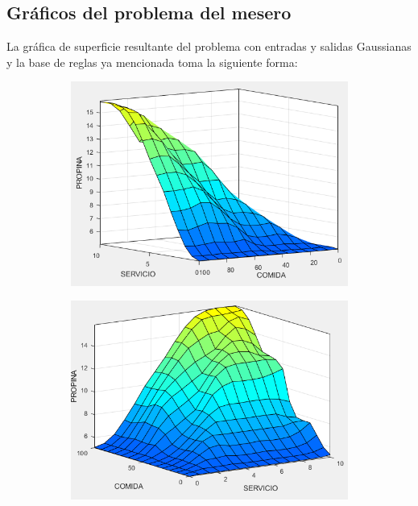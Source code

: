 \documentclass[11pt, letterpaper]{article}
\begin{document}
\newpage

\subsection{Gráficos del problema del mesero}

La gráfica de superficie resultante del problema con entradas y salidas Gaussianas y la base de reglas ya mencionada toma la siguiente forma:

\begin{figure}[h]
	\centering
	\begin{subfigure}{0.42\textwidth} %
		\centering
		\includegraphics[width=1.3\textwidth]{IMG/P14.png}
		\label{fig:G1}
	\end{subfigure}
	\hfill
	\begin{subfigure}{0.42\textwidth} %
		\centering
		\includegraphics[width=1.2\textwidth]{IMG/P15.png}
		\label{fig:G2}
	\end{subfigure}
	\label{fig:comparacion1}
\end{figure}
\end{document}
